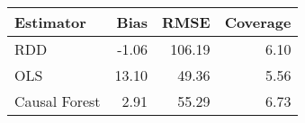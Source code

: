 \begin{table}[ht]
\centering
\begin{tabular}{lrrr}
  \hline
Estimator & Bias & RMSE & Coverage \\ 
  \hline
RDD & -1.06 & 106.19 & 6.10 \\ 
  OLS & 13.10 & 49.36 & 5.56 \\ 
  Causal Forest & 2.91 & 55.29 & 6.73 \\ 
   \hline
\end{tabular}
\caption{} 
\end{table}
